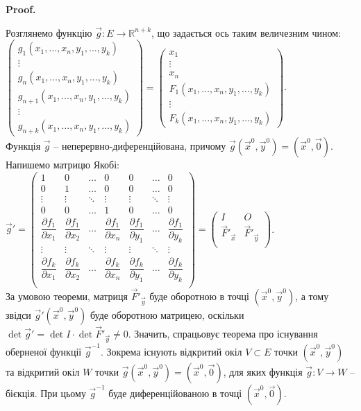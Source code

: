 \documentclass[a4paper, 10pt]{article}
\makeatletter
\def\departial#1#2{\dfrac{\partial {#1}}{\partial {#2}}}
\theoremstyle{theoremdd}
\theoremstyle{theoremdd}
\theoremstyle{theoremdd}
\theoremstyle{theoremdd}
\theoremstyle{theoremdd}
\theoremstyle{theoremdd}
\theoremstyle{theoremdd}
\theoremstyle{theoremdd}
\theoremstyle{theoremdd}
\renewenvironment{proof}[1][Proof.\\]{\par
\pushQED{\hfill \qed}%
\normalfont \topsep6\p@\@plus6\p@\relax
\trivlist
\item\relax
{\bfseries
#1\@addpunct{.}}\hspace\labelsep\ignorespaces
}{%
\popQED\endtrivlist\@endpefalse
}
\makeatother
\begin{document}
\begin{proof}
Розглянемо функцію $\vec{g} \colon E \to \mathbb{R}^{n+k}$, що задається ось таким величезним чином:\\
$\begin{pmatrix}
g_1(x_1,\dots,x_n, y_1,\dots,y_k) \\
\vdots \\
g_{n}(x_1,\dots,x_n, y_1,\dots,y_k) \\
g_{n+1}(x_1,\dots,x_n, y_1,\dots,y_k) \\
\vdots \\
g_{n+k}(x_1,\dots,x_n, y_1,\dots,y_k)
\end{pmatrix} = \begin{pmatrix}
x_1 \\
\vdots \\
x_n \\
F_1(x_1,\dots,x_n,y_1,\dots,y_k) \\
\vdots \\
F_k(x_1,\dots,x_n,y_1,\dots,y_k)
\end{pmatrix}$.\\
Функція $\vec{g}$ -- неперервно-диференційована, причому $\vec{g}(\vec{x}^0,\vec{y}^0) = (\vec{x}^0,\vec{0})$. Напишемо матрицю Якобі:\\
$\vec{g}' = \begin{pmatrix}
1 & 0 & \dots & 0 & 0 & \dots & 0 \\
0 & 1 & \dots & 0 & 0 & \dots & 0\\ 
\vdots & \vdots & \ddots & \vdots & \vdots & \ddots & \vdots \\
0 & 0 & \dots & 1 & 0 & \dots & 0 \\
\departial{f_1}{x_1} & \departial{f_1}{x_2} & \dots & \departial{f_1}{x_n} & \departial{f_1}{y_1} & \dots & \departial{f_1}{y_k} \\
\vdots & \vdots & \ddots & \vdots & \vdots & \ddots & \vdots \\
\departial{f_k}{x_1} & \departial{f_k}{x_2} & \dots & \departial{f_k}{x_n} & \departial{f_k}{y_1} & \dots & \departial{f_k}{y_k} \\
\end{pmatrix} = \begin{pmatrix}
I & O \\
\vec{F}'_{\vec{x}} & \vec{F}'_{\vec{y}} \\
\end{pmatrix}$.\\
За умовою теореми, матриця $\vec{F}'_{\vec{y}}$ буде оборотною в точці $(\vec{x}^0,\vec{y}^0)$, а тому звідси $\vec{g}'(\vec{x}^0,\vec{y}^0)$ буде оборотною матрицею, оскільки $\det \vec{g}' = \det I \cdot \det \vec{F}'_{\vec{y}} \neq 0$. Значить, спрацьовує теорема про існування оберненої функції $\vec{g}^{-1}$. Зокрема існують відкритий окіл $V \subset E$ точки $(\vec{x}^0,\vec{y}^0)$ та відкритий окіл $W$ точки $\vec{g}(\vec{x}^0,\vec{y}^0) = (\vec{x}^0,\vec{0})$, для яких функція $\vec{g} \colon V \to W$ -- бієкція. При цьому $\vec{g}^{-1}$ буде диференційованою в точці $(\vec{x}^0,\vec{0})$.\\

\end{proof}
\end{document}
